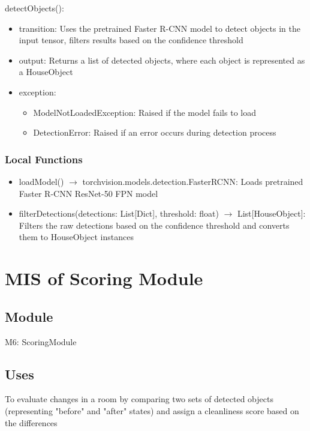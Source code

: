 \documentclass[12pt, titlepage]{article}
\begin{document}
\noindent detectObjects():
\begin{itemize}
\item transition: Uses the pretrained Faster R-CNN model to detect objects in the input tensor, filters results based on the confidence threshold
\item output: Returns a list of detected objects, where each object is represented as a HouseObject
\item exception: 
\begin{itemize}
  \item ModelNotLoadedException: Raised if the model fails to load
  \item DetectionError: Raised if an error occurs during detection process
\end{itemize}

\end{itemize}


\subsubsection{Local Functions}

\begin{itemize}
  \item loadModel() $\rightarrow$ torchvision.models.detection.FasterRCNN: Loads pretrained Faster R-CNN ResNet-50 FPN model
  \item filterDetections(detections: List[Dict], threshold: float) $\rightarrow$ List[HouseObject]: Filters the raw detections based on the confidence threshold and converts them to HouseObject instances
\end{itemize}

\newpage
 


\section{MIS of Scoring Module} \label{Module} 

\subsection{Module}

M6: ScoringModule

\subsection{Uses}
To evaluate changes in a room by comparing two sets of detected objects (representing "before" and "after" states) and assign a cleanliness score based on the differences
\end{document}
